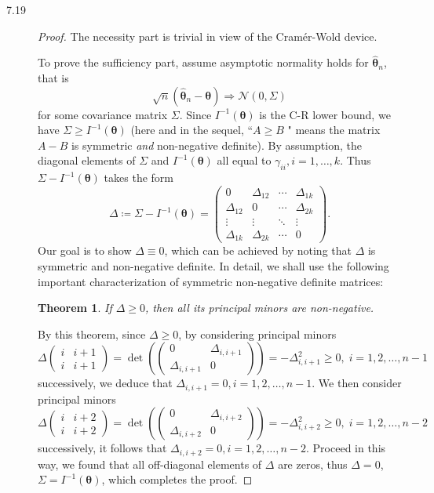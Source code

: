 \documentclass{article}
\newcommand{\gaussian}{\mathcal{N}}
\theoremstyle{definition}
\theoremstyle{plain}
\newtheorem*{thm}{Theorem}
\theoremstyle{remark}
\begin{document}
\begin{description}
\item[7.19]
\begin{proof}
The necessity part is trivial in view of the Cram\'{e}r-Wold device.

To prove the sufficiency part, assume asymptotic normality holds for
$\hat{\bm{\theta}}_n$, that is 
$$\sqrt{n}(\hat{\bm{\theta}}_n - \bm{\theta}) \Rightarrow \gaussian(0, \Sigma)$$
for some covariance matrix $\Sigma$. Since $I^{-1}(\bm{\theta})$ is the C-R lower 
bound, we have $\Sigma \geq I^{-1}(\bm{\theta})$ (here and in the sequel, ``$A \geq B$
" means the matrix $A - B$ is symmetric \emph{and} non-negative definite). By 
assumption, the diagonal elements of $\Sigma$ and $I^{-1}(\bm{\theta})$ all equal to 
$\gamma_{ii}, i = 1, \ldots, k$. Thus $\Sigma - I^{-1}(\bm{\theta})$ takes the form 
$$\Delta \coloneqq \Sigma - I^{-1}(\bm{\theta}) = 
\begin{pmatrix}
0 & \Delta_{12} & \cdots & \Delta_{1k} \\
\Delta_{12} & 0 & \cdots & \Delta_{2k} \\
\vdots & \vdots & \ddots & \vdots \\
\Delta_{1k} & \Delta_{2k} & \cdots & 0
\end{pmatrix}.
$$
Our goal is to show $\Delta \equiv 0$, which can be achieved by noting that $\Delta$
is symmetric and non-negative definite. In detail, we shall use the following important
characterization of symmetric non-negative definite matrices:
\begin{thm}
If $\Delta \geq 0$, then all its principal minors are non-negative.
\end{thm}
By this theorem, since $\Delta \geq 0$, by considering principal minors
$$\Delta\begin{pmatrix} i & i + 1 \\ i & i + 1 \end{pmatrix} = 
\det\left(\begin{pmatrix} 0 & \Delta_{i, i + 1} \\ \Delta_{i, i + 1} & 0\end{pmatrix}
\right) = -\Delta_{i, i + 1}^2 \geq 0, \; i = 1, 2, \ldots, n - 1$$
successively, we deduce that $\Delta_{i, i + 1} = 0, i = 1, 2, \ldots, n - 1$. We then
consider principal minors 
$$\Delta\begin{pmatrix} i & i + 2 \\ i & i + 2 \end{pmatrix} = 
\det\left(\begin{pmatrix} 0 & \Delta_{i, i + 2} \\ \Delta_{i, i + 2} & 0\end{pmatrix}
\right) = -\Delta_{i, i + 2}^2 \geq 0, \; i = 1, 2, \ldots, n - 2$$
successively, it follows that $\Delta_{i, i + 2} = 0, i = 1, 2, \ldots, n - 2$. 
Proceed in this way, we found that all off-diagonal elements of $\Delta$ are zeros, 
thus $\Delta = 0$, $\Sigma = I^{-1}(\bm{\theta})$, which completes the proof. 
\end{proof}
\end{description}
\end{document}
